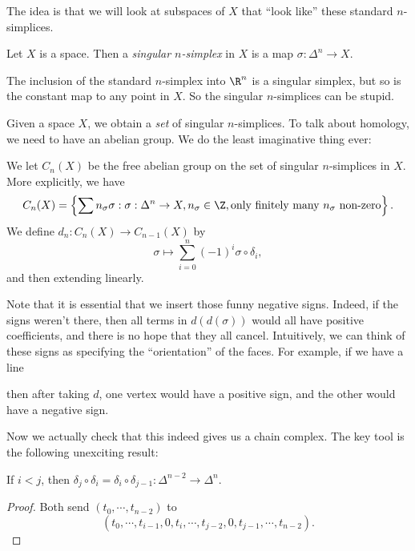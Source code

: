 \documentclass[a4paper]{article}
\theoremstyle{definition}
\begin{document}
The idea is that we will look at subspaces of $X$ that ``look like'' these standard $n$-simplices.
\begin{defi}
  Let $X$ is a space. Then a \emph{singular $n$-simplex} in $X$ is a map $\sigma: \Delta^n \to X$.
\end{defi}

\begin{eg}
  The inclusion of the standard $n$-simplex into $\R^n$ is a singular simplex, but so is the constant map to any point in $X$. So the singular $n$-simplices can be stupid.
\end{eg}

Given a space $X$, we obtain a \emph{set} of singular $n$-simplices. To talk about homology, we need to have an abelian group. We do the least imaginative thing ever:

\begin{defi}
  We let $C_n(X)$ be the free abelian group on the set of singular $n$-simplices in $X$. More explicitly, we have
  \[
    C_n(X) = \left\{\sum n_\sigma \sigma: \sigma: \Delta^n \to X, n_\sigma \in \Z, \text{only finitely many $n_\sigma$ non-zero}\right\}.
  \]
  We define $d_n: C_n(X) \to C_{n - 1}(X)$ by
  \[
    \sigma \mapsto \sum_{i = 0}^n (-1)^i \sigma \circ \delta_i,
  \]
  and then extending linearly.
\end{defi}
Note that it is essential that we insert those funny negative signs. Indeed, if the signs weren't there, then all terms in $d(d(\sigma))$ would all have positive coefficients, and there is no hope that they all cancel. Intuitively, we can think of these signs as specifying the ``orientation'' of the faces. For example, if we have a line
\begin{center}
\end{center}
then after taking $d$, one vertex would have a positive sign, and the other would have a negative sign.

Now we actually check that this indeed gives us a chain complex. The key tool is the following unexciting result:
\begin{lemma}
  If $i < j$, then $\delta_j \circ \delta_i = \delta_i \circ \delta_{j - 1} : \Delta^{n - 2} \to \Delta^n$.
\end{lemma}

\begin{proof}
  Both send $(t_0, \cdots, t_{n - 2})$ to
  \[
    (t_0, \cdots, t_{i - 1}, 0, t_i, \cdots, t_{j - 2}, 0, t_{j - 1}, \cdots, t_{n - 2}).
  \]
\end{proof}
\end{document}
